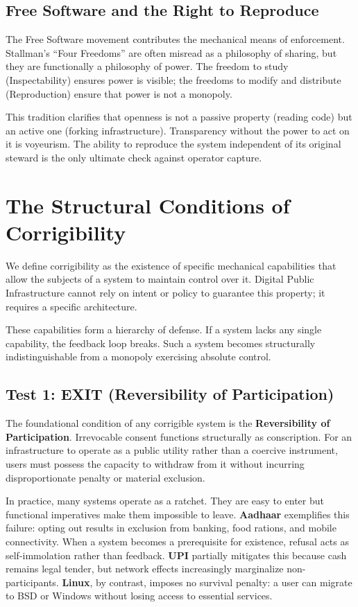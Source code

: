 \documentclass{article}
\begin{document}
\subsection{Free Software and the Right to Reproduce}

The Free Software movement \citep{stallman2002} contributes the mechanical means of enforcement. Stallman's ``Four Freedoms'' are often misread as a philosophy of sharing, but they are functionally a philosophy of power. The freedom to study (Inspectability) ensures power is visible; the freedoms to modify and distribute (Reproduction) ensure that power is not a monopoly.

This tradition clarifies that openness is not a passive property (reading code) but an active one (forking infrastructure). Transparency without the power to act on it is voyeurism. The ability to reproduce the system independent of its original steward is the only ultimate check against operator capture.

\section{The Structural Conditions of Corrigibility}

We define corrigibility as the existence of specific mechanical capabilities that allow the subjects of a system to maintain control over it. Digital Public Infrastructure cannot rely on intent or policy to guarantee this property; it requires a specific architecture.

These capabilities form a hierarchy of defense. If a system lacks any single capability, the feedback loop breaks. Such a system becomes structurally indistinguishable from a monopoly exercising absolute control.

\subsection{Test 1: EXIT (Reversibility of Participation)}

The foundational condition of any corrigible system is the \textbf{Reversibility of Participation}. Irrevocable consent functions structurally as conscription. For an infrastructure to operate as a public utility rather than a coercive instrument, users must possess the capacity to withdraw from it without incurring disproportionate penalty or material exclusion.

In practice, many systems operate as a ratchet. They are easy to enter but functional imperatives make them impossible to leave. \textbf{Aadhaar} exemplifies this failure: opting out results in exclusion from banking, food rations, and mobile connectivity. When a system becomes a prerequisite for existence, refusal acts as self-immolation rather than feedback. \textbf{UPI} partially mitigates this because cash remains legal tender, but network effects increasingly marginalize non-participants. \textbf{Linux}, by contrast, imposes no survival penalty: a user can migrate to BSD or Windows without losing access to essential services.
\end{document}
